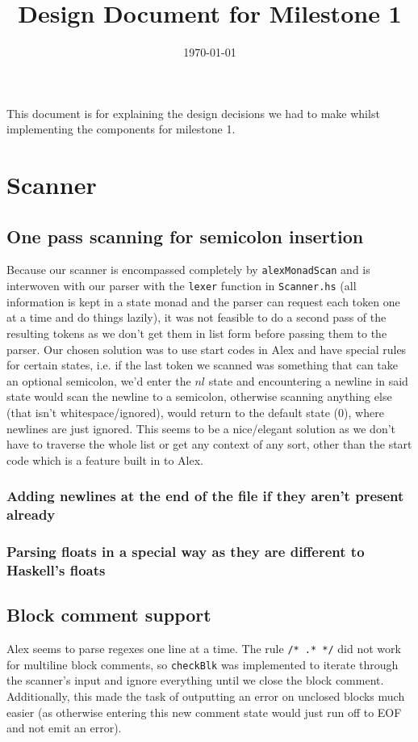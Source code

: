 \documentclass[11pt]{article}
\date{\today}
\title{Design Document for Milestone 1}
\begin{document}
\maketitle
\tableofcontents

This document is for explaining the design decisions we had to make
whilst implementing the components for milestone 1.
\section{Scanner}
\label{sec:orga06c7b3}
\subsection{One pass scanning for semicolon insertion}
\label{sec:org6905b69}
Because our scanner is encompassed completely by \texttt{alexMonadScan}
and is interwoven with our parser with the \texttt{lexer} function in
\texttt{Scanner.hs} (all information is kept in a state monad and the
parser can request each token one at a time and do things lazily),
it was not feasible to do a second pass of the resulting tokens as
we don't get them in list form before passing them to the
parser. Our chosen solution was to use start codes in Alex and have
special rules for certain states, i.e. if the last token we scanned
was something that can take an optional semicolon, we'd enter the
\(nl\) state and encountering a newline in said state would scan the
newline to a semicolon, otherwise scanning anything else (that
isn't whitespace/ignored), would return to the default state (\(0\)),
where newlines are just ignored. This seems to be a nice/elegant
solution as we don't have to traverse the whole list or get any
context of any sort, other than the start code which is a feature
built in to Alex.
\subsubsection{Adding newlines at the end of the file if they aren't present already}
\label{sec:org00a04e3}
\subsubsection{Parsing floats in a special way as they are different to Haskell's floats}
\label{sec:org9bf3088}
\subsection{Block comment support}
\label{sec:org93845b9}
Alex seems to parse regexes one line at a time. The rule \texttt{/* .* */}
did not work for multiline block comments, so \texttt{checkBlk} was
implemented to iterate through the scanner's input and ignore
everything until we close the block comment. Additionally, this
made the task of outputting an error on unclosed blocks much easier
(as otherwise entering this new comment state would just run off to
EOF and not emit an error).
\end{document}
